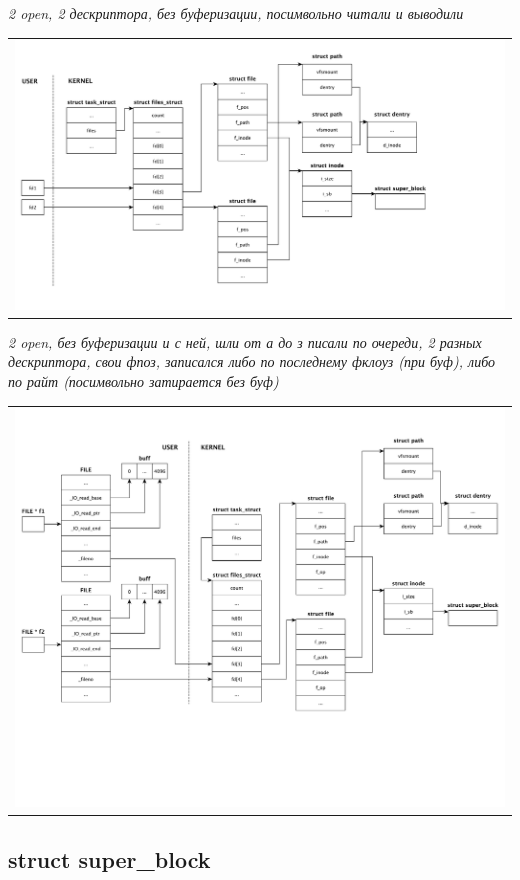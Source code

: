 \textit{2 open, 2 дескриптора, без буферизации, посимвольно читали и выводили}
\begin{table}[H]
  \centering
  \begin{tabular}{p{1\linewidth}}
    \centering
    \includegraphics[width=0.8\linewidth]{./images/scheme2.pdf}
  \end{tabular}
\end{table}

\textit{2 open, без буферизации и с ней, шли от а до з писали по очереди, 2 разных дескриптора, свои фпоз, записался либо по последнему фклоуз (при буф), либо по райт (посимвольно затирается без буф)}
\begin{table}[H]
  \centering
  \begin{tabular}{p{1\linewidth}}
    \centering
    \includegraphics[width=0.8\linewidth]{./images/scheme3.pdf}
  \end{tabular}
\end{table}


\subsection{struct super\_block}

